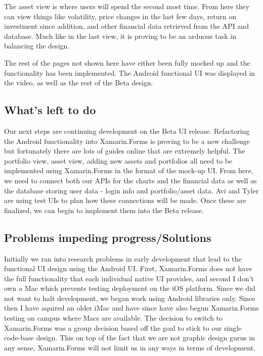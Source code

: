 \documentclass[letterpaper,10pt,titlepage,journal,compsoc,draftclsnofoot,onecolumn]{IEEEtran}
\begin{document}
The asset view is where users will spend the second most time. From here they can view things like volatility, price changes in the last few days, return on investment since addition, and other financial data retrieved from the API and database. Much like in the last view, it is proving to be an arduous task in balancing the design.

The rest of the pages not shown here have either been fully mocked up and the functionality has been implemented. The Android functional UI was displayed in the video, as well as the rest of the Beta design. 

\subsection{What's left to do}

Our next steps are continuing development on the Beta UI release. Refactoring the Android functionality into Xamarin.Forms is proving to be a new challenge but fortunately there are lots of guides online that are extremely helpful. The portfolio view, asset view, adding new assets and portfolios all need to be implemented using Xamarin.Forms in the format of the mock-up UI. From here, we need to connect both our APIs for the charts and the financial data as well as the database storing user data - login info and portfolio/asset data. Avi and Tyler are using test UIs to plan how these connections will be made. Once these are finalized, we can begin to implement them into the Beta release.

\subsection{Problems impeding progress/Solutions}

Initially we ran into research problems in early development that lead to the functional UI design using the Android UI. First, Xamarin.Forms does not have the full functionality that each individual native UI provides, and second I don't own a Mac which prevents testing deployment on the iOS platform. Since we did not want to halt development, we began work using Android libraries only. Since then I have aquired an older iMac and have since have also begun Xamarin.Forms testing on campus where Macs are available. The decision to switch to Xamarin.Forms was a group decision based off the goal to stick to our single code-base design. This on top of the fact that we are not graphic design gurus in any sense, Xamarin.Forms will not limit us in any ways in terms of development.
\end{document}
